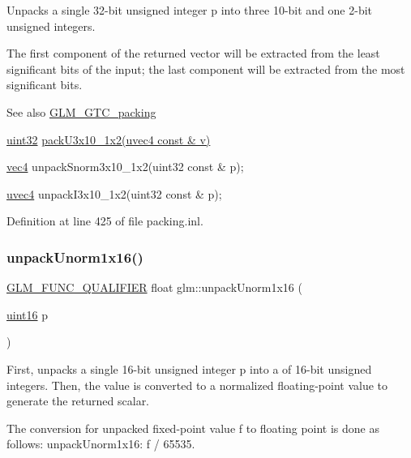 Unpacks a single 32-\/bit unsigned integer p into three 10-\/bit and one 2-\/bit unsigned integers.

The first component of the returned vector will be extracted from the least significant bits of the input; the last component will be extracted from the most significant bits.

\begin{DoxySeeAlso}{See also}
\hyperlink{group__gtc__packing}{G\+L\+M\+\_\+\+G\+T\+C\+\_\+packing} 

\hyperlink{group__gtc__type__precision_ga202b6a53c105fcb7e531f9b443518451}{uint32} \hyperlink{group__gtc__packing_gaf656d8862628f96b20de7a36eaa1fe56}{pack\+U3x10\+\_\+1x2(uvec4 const \& v)} 

\hyperlink{group__core__types_ga5881b1b022d7fd1b7218f5916532dd02}{vec4} unpack\+Snorm3x10\+\_\+1x2(uint32 const \& p); 

\hyperlink{group__core__types_ga1c426d19627b32b14f0089f7f4ba7b1d}{uvec4} unpack\+I3x10\+\_\+1x2(uint32 const \& p); 
\end{DoxySeeAlso}


Definition at line 425 of file packing.\+inl.

\mbox{\label{group__gtc__packing_ga7770e3ade4f4764cc1b2eb42ac4ec188}} 
\subsubsection{\texorpdfstring{unpack\+Unorm1x16()}{unpackUnorm1x16()}}
{\footnotesize\ttfamily \hyperlink{setup_8hpp_a33fdea6f91c5f834105f7415e2a64407}{G\+L\+M\+\_\+\+F\+U\+N\+C\+\_\+\+Q\+U\+A\+L\+I\+F\+I\+ER} float glm\+::unpack\+Unorm1x16 (\begin{DoxyParamCaption}\item[{\hyperlink{group__gtc__type__precision_gad8c2939e1fdd8e5828b31d95c52255d5}{uint16}}]{p }\end{DoxyParamCaption})}

First, unpacks a single 16-\/bit unsigned integer p into a of 16-\/bit unsigned integers. Then, the value is converted to a normalized floating-\/point value to generate the returned scalar.

The conversion for unpacked fixed-\/point value f to floating point is done as follows\+: unpack\+Unorm1x16\+: f / 65535.

